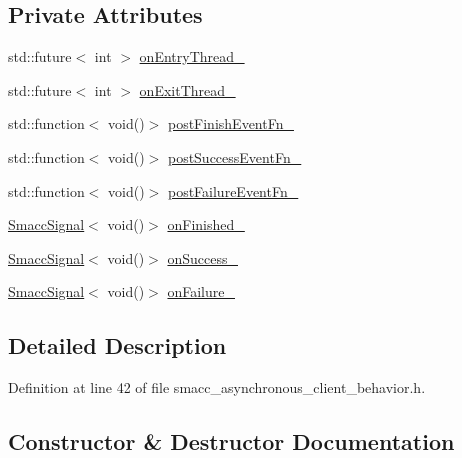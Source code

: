 \subsection*{Private Attributes}
\begin{DoxyCompactItemize}
\item 
std\+::future$<$ int $>$ \hyperlink{classsmacc_1_1SmaccAsyncClientBehavior_a6346e036a68f41c4397d7336f8519645}{on\+Entry\+Thread\+\_\+}
\item 
std\+::future$<$ int $>$ \hyperlink{classsmacc_1_1SmaccAsyncClientBehavior_af76d1c36b4a10425f2da043545b73299}{on\+Exit\+Thread\+\_\+}
\item 
std\+::function$<$ void()$>$ \hyperlink{classsmacc_1_1SmaccAsyncClientBehavior_af7a9ee952ba3fb8629aa55491606a7b2}{post\+Finish\+Event\+Fn\+\_\+}
\item 
std\+::function$<$ void()$>$ \hyperlink{classsmacc_1_1SmaccAsyncClientBehavior_a944ed10880796d53649bee39dc1299c0}{post\+Success\+Event\+Fn\+\_\+}
\item 
std\+::function$<$ void()$>$ \hyperlink{classsmacc_1_1SmaccAsyncClientBehavior_a8041c43a0381f18fae6470a98eb9273d}{post\+Failure\+Event\+Fn\+\_\+}
\item 
\hyperlink{classsmacc_1_1SmaccSignal}{Smacc\+Signal}$<$ void()$>$ \hyperlink{classsmacc_1_1SmaccAsyncClientBehavior_a3b4f8bbacabffb8a37934407bc79ed80}{on\+Finished\+\_\+}
\item 
\hyperlink{classsmacc_1_1SmaccSignal}{Smacc\+Signal}$<$ void()$>$ \hyperlink{classsmacc_1_1SmaccAsyncClientBehavior_a31d8bdfa46fe70aea9adf0958806462b}{on\+Success\+\_\+}
\item 
\hyperlink{classsmacc_1_1SmaccSignal}{Smacc\+Signal}$<$ void()$>$ \hyperlink{classsmacc_1_1SmaccAsyncClientBehavior_a34e6262de21b9fbbabbc466d3180cc18}{on\+Failure\+\_\+}
\end{DoxyCompactItemize}


\subsection{Detailed Description}


Definition at line 42 of file smacc\+\_\+asynchronous\+\_\+client\+\_\+behavior.\+h.



\subsection{Constructor \& Destructor Documentation}
\mbox{\label{classsmacc_1_1SmaccAsyncClientBehavior_a0028345c409db6fdead7a16b23b9f0aa}} 
